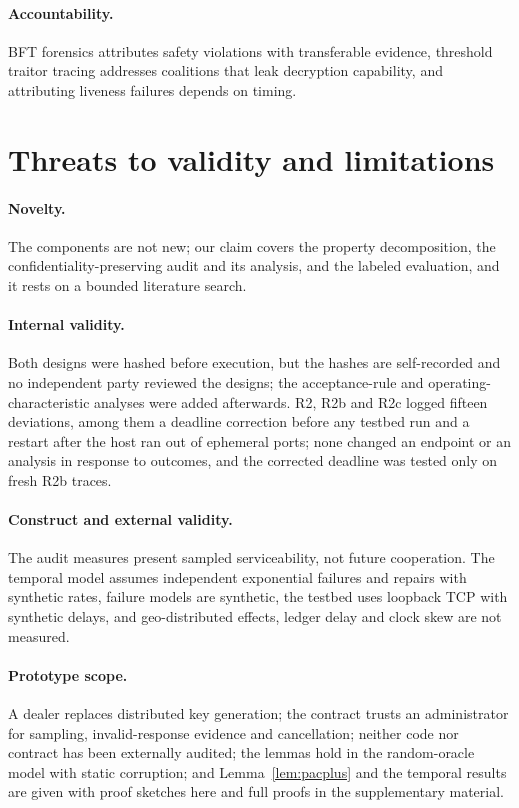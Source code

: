 \documentclass[Crown,sagev]{sagej}
\theoremstyle{plain}
\theoremstyle{definition}
\theoremstyle{remark}
\begin{document}
\paragraph{Accountability.} BFT forensics\cite{sheng2021forensics} attributes safety violations with transferable evidence, threshold traitor tracing addresses coalitions that leak decryption capability\cite{boneh2023accountability}, and attributing liveness failures depends on timing\cite{lewis2025accountable}.

\section{Threats to validity and limitations}\label{sec:validity}

\paragraph{Novelty.} The components are not new; our claim covers the property decomposition, the confidentiality-preserving audit and its analysis, and the labeled evaluation, and it rests on a bounded literature search.

\paragraph{Internal validity.} Both designs were hashed before execution, but the hashes are self-recorded and no independent party reviewed the designs; the acceptance-rule and operating-characteristic analyses were added afterwards. R2, R2b and R2c logged fifteen deviations, among them a deadline correction before any testbed run and a restart after the host ran out of ephemeral ports; none changed an endpoint or an analysis in response to outcomes, and the corrected deadline was tested only on fresh R2b traces. 

\paragraph{Construct and external validity.} The audit measures present sampled serviceability, not future cooperation. The temporal model assumes independent exponential failures and repairs with synthetic rates, failure models are synthetic, the testbed uses loopback TCP with synthetic delays, and geo-distributed effects, ledger delay and clock skew are not measured.

\paragraph{Prototype scope.} A dealer replaces distributed key generation; the contract trusts an administrator for sampling, invalid-response evidence and cancellation; neither code nor contract has been externally audited; the lemmas hold in the random-oracle model with static corruption; and Lemma~\ref{lem:pacplus} and the temporal results are given with proof sketches here and full proofs in the supplementary material.
\end{document}
